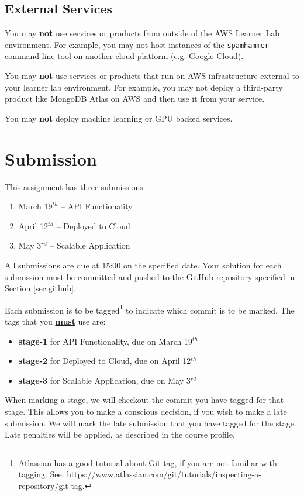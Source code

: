 \documentclass{csse4400}
\begin{document}
\subsection{External Services}
You may \textbf{not} use services or products from outside of the AWS Learner Lab environment.
For example, you may not host instances of the \texttt{spamhammer} command line tool on another cloud platform
(e.g. Google Cloud).

You may \textbf{not} use services or products that run on AWS infrastructure external to your learner lab environment.
For example, you may not deploy a third-party product like MongoDB Atlas on AWS and then use it from your service.

You may \textbf{not} deploy machine learning or GPU backed services.

\section{Submission}
This assignment has three submissions.

\begin{enumerate}
  \item March 19$^{th}$ -- API Functionality
  \item April 12$^{th}$ -- Deployed to Cloud
  \item May 3$^{rd}$ -- Scalable Application
\end{enumerate}
All submissions are due at 15:00 on the specified date.
Your solution for each submission must be committed and pushed to the GitHub repository specified in Section \ref{sec:github}.

Each submission is to be tagged\footnote{Atlassian has a good tutorial about Git tag, if you are not familiar with tagging. See: \url{https://www.atlassian.com/git/tutorials/inspecting-a-repository/git-tag}.}
to indicate which commit is to be marked.
The tags that you \textbf{\underline{must}} use are:
\begin{itemize}
  \item \textbf{stage-1} for API Functionality, due on March 19$^{th}$
  \item \textbf{stage-2} for Deployed to Cloud, due on April 12$^{th}$
  \item \textbf{stage-3} for Scalable Application, due on May 3$^{rd}$
\end{itemize}

When marking a stage, we will checkout the commit you have tagged for that stage.
This allows you to make a conscious decision, if you wish to make a late submission.
We will mark the late submission that you have tagged for the stage.
Late penalties will be applied, as described in the course profile.
\end{document}

